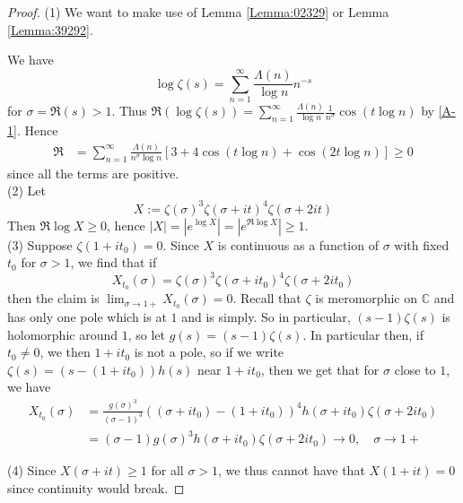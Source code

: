 \documentclass[reqno]{amsart}
\theoremstyle{definition}
\theoremstyle{remark}
\begin{document}
\begin{proof}
    (1) We want to make use of
    Lemma \ref{Lemma:02329} or Lemma
    \ref{Lemma:39292}.

    We have
    \[
    \log \zeta \left( s \right) 
    = \sum_{n=1}^{\infty} \frac{\Lambda (n)}{\log n}n^{-s}
    \] 
    for $\sigma = \Re (s) > 1$.
    Thus
    $\Re \left( \log \zeta (s) \right) 
    = \sum_{n=1}^{\infty} \frac{\Lambda (n)}{\log n}
    \frac{1}{n^{\sigma}} \cos \left( t \log n \right) $ by
    \eqref{A-1}.
    Hence
    \begin{align*}
        \Re 
        &= \sum_{n=1}^{\infty} 
        \frac{\Lambda (n)}{n^{\sigma} \log n}
        \left[ 3 + 4 \cos (t \log n) +
        \cos (2t \log n )\right]
        \ge 0
    \end{align*}
    since all the terms are positive.\\
    \linebreak
    (2)
    Let
    \[
    X :=  \zeta (\sigma)^3 
    \zeta\left( \sigma + it  \right)^{4} 
    \zeta \left( \sigma + 2 it  \right) 
    \] 
    Then
    $\Re \log X \ge 0$, hence
    $\left| X \right|  = \left| e^{\log X} \right|  =
    \left| e^{\Re \log X} \right| 
      \ge 1$.\\
      \linebreak
      (3) Suppose
      $\zeta \left( 1+ it_0  \right) =0$.
      Since
      $X$ is continuous as a function of
      $\sigma$ with fixed $t_0$
      for $\sigma > 1$, we find that
      if
      \[
      X_{t_0} (\sigma) = \zeta(\sigma)^3
      \zeta\left( \sigma + it_0  \right)^{4}
      \zeta \left( \sigma + 2 it_0  \right) 
      \] 
      then the claim is
      $\lim_{\sigma \to 1+}X_{t_0}(\sigma) = 0$.
      Recall that $\zeta$ is meromorphic
      on $\mathbb{C}$ and has only one
      pole which is at $1$ and is simply.
      So in particular,
      $(s-1) \zeta(s)$ is holomorphic around
      $1$, so let
      $g(s) = (s-1) \zeta(s)$.
      In particular then, if
      $t_0 \neq 0$, we then
      $1+ it_0 $ is not a pole, so
      if we write
      $\zeta \left( s \right) 
      = (s- \left( 1+it_0  \right))
      h(s)$ near $1+it_0 $, then we get
      that for $\sigma$ close to $1$, we have
      \begin{align*}
      X_{t_0}(\sigma) 
      &= 
      \frac{g(\sigma)^3}{(\sigma-1)^3}
      \left( \left( \sigma + it_0  \right) 
      - \left( 1+it_0  \right)  \right)^{4}
      h(\sigma + it_0) 
      \zeta \left( \sigma + 2 it_0 \right) \\
      &= \left( \sigma-1 \right) g(\sigma)^3
      h\left( \sigma+it_0 \right) 
      \zeta\left( \sigma+ 2it_0 \right) \to
      0, \quad \sigma \to 1+
      \end{align*}

      (4) Since $X 
      \left( \sigma + it \right) \ge 1$ for
      all $\sigma > 1$, we thus cannot
      have that
      $X\left( 1+it \right) = 0$
      since continuity would break.

\end{proof}
\end{document}
